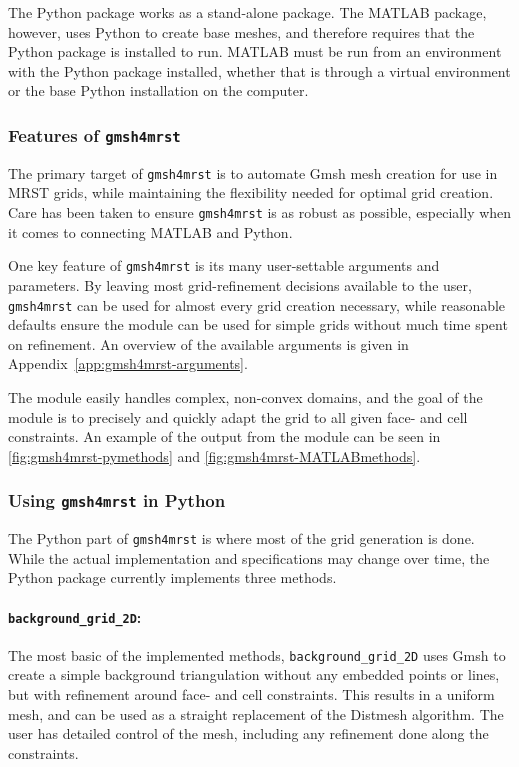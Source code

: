 The Python package works as a stand-alone package. The MATLAB package, however, uses Python to create base meshes, and therefore requires that the Python package is installed to run. MATLAB must be run from an environment with the Python package installed, whether that is through a virtual environment or the base Python installation on the computer.


\subsubsection{Features of \texttt{gmsh4mrst}}
The primary target of \verb|gmsh4mrst| is to automate Gmsh mesh creation for use in MRST grids, while maintaining the flexibility needed for optimal grid creation. Care has been taken to ensure \verb|gmsh4mrst| is as robust as possible, especially when it comes to connecting MATLAB and Python.

One key feature of \verb|gmsh4mrst| is its many user-settable arguments and parameters. By leaving most grid-refinement decisions available to the user, \verb|gmsh4mrst| can be used for almost every grid creation necessary, while reasonable defaults ensure the module can be used for simple grids without much time spent on refinement. An overview of the available arguments is given in Appendix~\ref{app:gmsh4mrst-arguments}.

The module easily handles complex, non-convex domains, and the goal of the module is to precisely and quickly adapt the grid to all given face- and cell constraints. An example of the output from the module can be seen in \autoref{fig:gmsh4mrst-pymethods} and \autoref{fig:gmsh4mrst-MATLABmethods}.

\subsubsection{Using \texttt{gmsh4mrst} in Python}
The Python part of \verb|gmsh4mrst| is where most of the grid generation is done. While the actual implementation and specifications may change over time, the Python package currently implements three methods.

\paragraph{\texttt{background\_grid\_2D}:}
The most basic of the implemented methods, \verb|background_grid_2D| uses Gmsh to create a simple background triangulation without any embedded points or lines, but with refinement around face- and cell constraints. This results in a uniform mesh, and can be used as a straight replacement of the Distmesh algorithm. The user has detailed control of the mesh, including any refinement done along the constraints.

